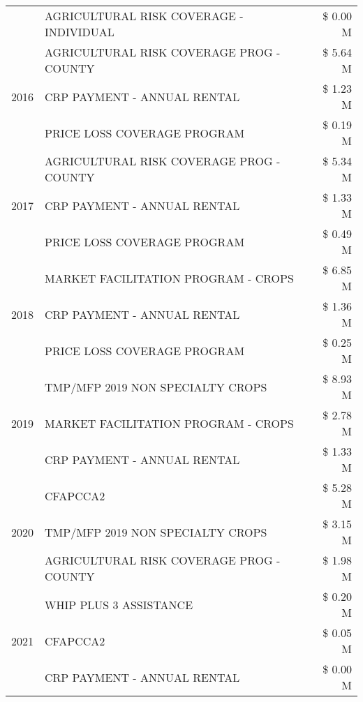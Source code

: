 \begin{tabular}{llr}
 & AGRICULTURAL RISK COVERAGE - INDIVIDUAL & \$ 0.00 M \\
\cline{1-3}
\multirow[t]{3}{*}{2016} & AGRICULTURAL RISK COVERAGE PROG - COUNTY      & \$ 5.64 M \\
 & CRP PAYMENT - ANNUAL RENTAL                   & \$ 1.23 M \\
 & PRICE LOSS COVERAGE PROGRAM                   & \$ 0.19 M \\
\cline{1-3}
\multirow[t]{3}{*}{2017} & AGRICULTURAL RISK COVERAGE PROG - COUNTY & \$ 5.34 M \\
 & CRP PAYMENT - ANNUAL RENTAL & \$ 1.33 M \\
 & PRICE LOSS COVERAGE PROGRAM & \$ 0.49 M \\
\cline{1-3}
\multirow[t]{3}{*}{2018} & MARKET FACILITATION PROGRAM - CROPS & \$ 6.85 M \\
 & CRP PAYMENT - ANNUAL RENTAL & \$ 1.36 M \\
 & PRICE LOSS COVERAGE PROGRAM & \$ 0.25 M \\
\cline{1-3}
\multirow[t]{3}{*}{2019} & TMP/MFP 2019 NON SPECIALTY CROPS & \$ 8.93 M \\
 & MARKET FACILITATION PROGRAM - CROPS & \$ 2.78 M \\
 & CRP PAYMENT - ANNUAL RENTAL & \$ 1.33 M \\
\cline{1-3}
\multirow[t]{3}{*}{2020} & CFAPCCA2 & \$ 5.28 M \\
 & TMP/MFP 2019 NON SPECIALTY CROPS & \$ 3.15 M \\
 & AGRICULTURAL RISK COVERAGE PROG - COUNTY & \$ 1.98 M \\
\cline{1-3}
\multirow[t]{3}{*}{2021} & WHIP PLUS 3 ASSISTANCE & \$ 0.20 M \\
 & CFAPCCA2 & \$ 0.05 M \\
 & CRP PAYMENT - ANNUAL RENTAL & \$ 0.00 M \\
\cline{1-3}
\bottomrule
\end{tabular}
